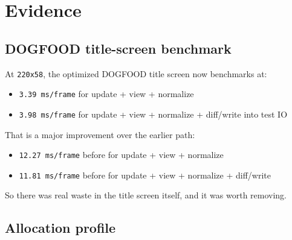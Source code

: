 \section{Evidence}\label{record-052-evidence}

\subsection{DOGFOOD title-screen benchmark}\label{record-052-dogfood-title-screen-benchmark}

At \texttt{2\allowbreak{}2\allowbreak{}0\allowbreak{}x\allowbreak{}5\allowbreak{}8}, the optimized DOGFOOD title screen now benchmarks at:

\begin{itemize}
\tightlist
\item
  \texttt{3\allowbreak{}.\allowbreak{}3\allowbreak{}9\allowbreak{} \allowbreak{}m\allowbreak{}s\allowbreak{}/\allowbreak{}f\allowbreak{}r\allowbreak{}a\allowbreak{}m\allowbreak{}e} for update + view + normalize
\item
  \texttt{3\allowbreak{}.\allowbreak{}9\allowbreak{}8\allowbreak{} \allowbreak{}m\allowbreak{}s\allowbreak{}/\allowbreak{}f\allowbreak{}r\allowbreak{}a\allowbreak{}m\allowbreak{}e} for update + view + normalize + diff/write into test IO
\end{itemize}

That is a major improvement over the earlier path:

\begin{itemize}
\tightlist
\item
  \texttt{1\allowbreak{}2\allowbreak{}.\allowbreak{}2\allowbreak{}7\allowbreak{} \allowbreak{}m\allowbreak{}s\allowbreak{}/\allowbreak{}f\allowbreak{}r\allowbreak{}a\allowbreak{}m\allowbreak{}e} before for update + view + normalize
\item
  \texttt{1\allowbreak{}1\allowbreak{}.\allowbreak{}8\allowbreak{}1\allowbreak{} \allowbreak{}m\allowbreak{}s\allowbreak{}/\allowbreak{}f\allowbreak{}r\allowbreak{}a\allowbreak{}m\allowbreak{}e} before for update + view + normalize + diff/write
\end{itemize}

So there was real waste in the title screen itself, and it was worth removing.

\subsection{Allocation profile}\label{record-052-allocation-profile}

